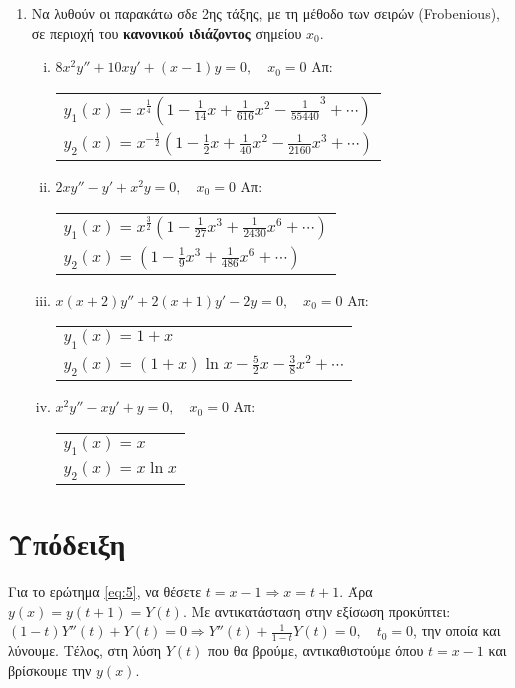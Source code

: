 \begin{enumerate}
  \item Να λυθούν οι παρακάτω σδε 2ης τάξης, με τη μέθοδο των σειρών (Frobenious),
    σε περιοχή του \textbf{κανονικού ιδιάζοντος} σημείου $ x_{0} $.
    \begin{enumerate}[i)]
      \item $ 8x^{2}y'' + 10xy' + (x-1)y = 0, \quad x_{0} = 0 $ 
        \hfill Απ: 
        \begin{tabular}{l} 
          $ \scriptstyle{y_{1}(x) = x^{\frac{1}{4}}\left(1 - \frac{1}{14}x + 
          \frac{1}{616}x^{2} - \frac{1}{55440}^{3} + \cdots\right)}$ \\
          $ \scriptstyle{y_{2}(x) = x^{- \frac{1}{2}} \left(1 - \frac{1}{2} x + 
          \frac{1}{40} x^{2} - \frac{1}{2160} x^{3} + \cdots\right)} $	
        \end{tabular}   
      \item $ 2xy'' - y' +x^{2}y = 0, \quad x_{0} = 0$ 
        \hfill Απ: 
        \begin{tabular}{l}
          $\scriptstyle{ y_{1}(x) = x^{\frac{3}{2}}\left(1 - \frac{1}{27}x^{3} +
          \frac{1}{2430}x^{6} + \cdots\right)}$  \\
          $\scriptstyle{ y_{2}(x) = \left(1 - \frac{1}{9} x^{3} + \frac{1}{486} x^{6} +
          \cdots\right)} $
        \end{tabular}
      \item $ x(x+2)y'' + 2(x+1)y' - 2y = 0, \quad x_{0} = 0$ 
        \hfill Απ: 
        \begin{tabular}{l}
          $ \scriptstyle{ y_{1}(x) = 1 + x} $ \\
          $ \scriptstyle{ y_{2}(x) = (1+x) \ln{x} - \frac{5}{2} x - 
          \frac{3}{8} x^{2}} + \cdots $
        \end{tabular}  
      \item $ x^{2}y'' - xy' + y = 0, \quad x_{0} = 0 $ 
        \hfill Απ: 
        \begin{tabular}{l}
          $\scriptstyle{ y_{1}(x) = x }$ \\
          $\scriptstyle{ y_{2}(x) = x \ln{x}} $
        \end{tabular} 
    \end{enumerate}
\end{enumerate}

\vspace{\baselineskip}


\section*{Υπόδειξη}
Για το ερώτημα \ref{eq:5}, να θέσετε $ t = x - 1 \Rightarrow x = t+1 $. Άρα $ y(x) =
y(t+1) = Y(t) $. Με αντικατάσταση στην εξίσωση προκύπτει:
$ (1-t)Y''(t) + Y(t) = 0 \Rightarrow Y''(t) + \frac{1}{1-t} Y(t) = 0, \quad t_{0} = 0 $,
την οποία και λύνουμε. Τέλος, στη λύση $ Y(t) $ που θα βρούμε, αντικαθιστούμε όπου 
$t=x-1 $  και βρίσκουμε την  $ y(x) $.



